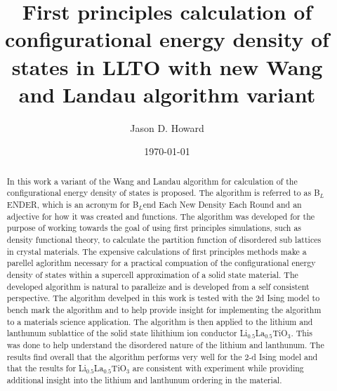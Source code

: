 \documentclass[aps,prl,reprint,superscriptaddress,showkeys]{revtex4-1}
\begin{document}
\title{First principles calculation of configurational energy density of states in LLTO with new Wang and Landau algorithm variant }

\author{Jason D. Howard}

\date{\today}

%


\begin{acknowledgments}
\end{acknowledgments}
\begin{abstract}
In this work  a variant of the Wang and Landau algorithm   for calculation of  the configurational energy density of states is proposed. The algorithm is referred to as B$_L$ENDER, which is an acronym for B$_L$end Each New Density Each Round and an  adjective for  how it was created and functions. The algorithm was developed for the purpose of working towards the goal of using first principles simulations, such as density functional theory, to calculate the partition function of disordered sub lattices in crystal materials. The expensive calculations of first principles methods make a parellel aglorithm necessary for a practical compuation of the configurational energy density of states within a supercell approximation of a solid state material. The developed algorithm is natural to paralleize and is developed from a self consistent perspective.  The algorithm develped in this work is tested with the 2d Ising model to bench mark the algorithm and to help provide insight for implementing the algorithm to a materials science application. The algorithm is then applied to the lithium and lanthunum sublattice of the solid state lihithium ion conductor Li$_{0.5}$La$_{0.5}$TiO$_{3}$. This was done to help understand the disordered nature of the lithium and lanthunum. The results find overall that the algorithm performs very well for the 2-d Ising model and that the results for Li$_{0.5}$La$_{0.5}$TiO$_{3}$ are consistent with experiment while providing additional insight into the lithium and lanthunum ordering in the material. 
\end{abstract}
\maketitle
\end{document}
